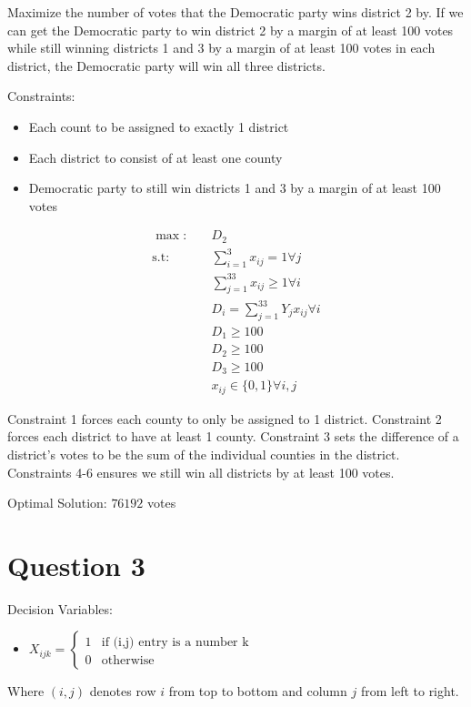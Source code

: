 \documentclass{report}
\begin{document}
Maximize the number of votes that the Democratic party wins district 2 by. If we can get the Democratic party to win district 2 by a margin of at least 100 votes while still winning districts 1 and 3 by a margin of at least 100 votes in each district, the Democratic party will win all three districts. 

Constraints: 
\begin{itemize}
	\item Each count to be assigned to exactly 1 district \\
	\item Each district to consist of at least one county \\
	\item Democratic party to still win districts 1 and 3 by a margin of at least 100 votes
\end{itemize}


\begin{align*}
	\max_{}: \quad & D_{2}  \\
\text{s.t}: \quad &  \sum_{i=1}^{3} x_{ij} = 1 \forall j\\
& \sum_{j=1}^{33} x_{ij} \ge 1 \forall i\\ 
& D_{i} = \sum_{j=1}^{33} Y_{j} x_{ij} \forall i \\
& D_{1}  \ge 100 \\
& D_{2} \ge 100\\ 
& D_{3}  \ge 100 \\
& x_{ij} \in \{0,1\} \forall i,j
\end{align*}

Constraint 1 forces each county to only be assigned to 1 district. Constraint 2 forces each district to have at least 1 county. Constraint 3 sets the difference of a district's votes to be the sum of the individual counties in the district. Constraints 4-6 ensures we still win all districts by at least 100 votes.  

Optimal Solution: $ \boxed{76192}$ votes 


\newpage
\section{Question 3}


Decision Variables:
\begin{itemize}
	\item $ X_{ijk} = \begin{cases}
			1 &\text{if (i,j) entry is a number k } \\
			0 & \text{otherwise}
	\end{cases} $ 
\end{itemize}
Where $ (i,j) $ denotes row $ i $ from top to bottom and column $ j $ from left to right. 
\end{document}
